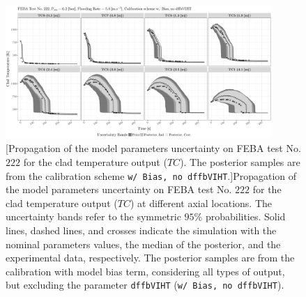 \clearpage
\begin{figure}
	\centering
	\includegraphics[width=0.90\textwidth]{../figures/chapter5/figures/plotTraceUQPosteriorAllDiscCenteredNoParam8TC222}
		[Propagation of the model parameters uncertainty on FEBA test No. $222$ for the clad temperature output ($TC$). The posterior samples are from the calibration scheme \texttt{w/ Bias, no dffbVIHT}.]{Propagation of the model parameters uncertainty on FEBA test No. $222$ for the clad temperature output ($TC$) at different axial locations. The uncertainty bands refer to the symmetric $95\%$ probabilities. Solid lines, dashed lines, and crosses indicate the simulation with the nominal parameters values, the median of the posterior, and the experimental data, respectively. The posterior samples are from the calibration with model bias term, considering all types of output, but excluding the parameter \texttt{dffbVIHT} (\texttt{w/ Bias, no dffbVIHT}).}
	\label{fig:ch5_plot_trace_uq_post_tc_222_noparam8}
\end{figure}
\clearpage

